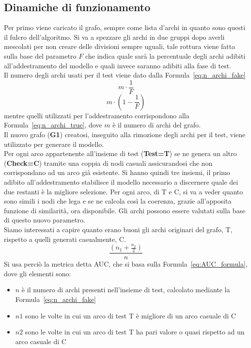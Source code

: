 \subsection{Dinamiche di funzionamento}
Per primo viene caricato il grafo, sempre come lista d'archi in quanto sono questi il fulcro dell'algoritmo. Si va a spezzare gli archi in due gruppi dopo averli mescolati per non creare delle divisioni sempre uguali, tale rottura viene fatta sulla base del parametro $F$ che indica quale sarà la percentuale degli archi adibiti all'addestramento del modello e quali invece saranno adibiti alla fase di test.\\
Il numero degli archi usati per il test viene dato dalla Formula~\ref{eq:n_archi_fake}
\begin{equation}
	m \cdot \frac{1}{F}
	\label{eq:n_archi_fake}
\end{equation} 
\begin{equation}
	m \cdot \left( 1- \frac{1}{F} \right)
	\label{eq:n_archi_true}
\end{equation}
mentre quelli utilizzati per l'addestramento corrispondono alla Formula~\ref{eq:n_archi_true}, dove $m$ è il numero di archi del grafo.\\
Il nuovo grafo (\textbf{G1}) creatosi, inseguito alla rimozione degli archi per il test, viene utilizzato per generare il modello.\\
Per ogni arco appartenente all'insieme di test (\textbf{Test=T}) se ne genera un altro (\textbf{Check=C}) tramite una coppia di nodi casuali assicurandosi che non corrispondano ad un arco già esistente. Si hanno quindi tre insiemi, il primo adibito all'addestramento stabilisce il modello necessario a discernere quale dei due restanti è la migliore selezione.
Per ogni arco, di T e C, si va a veder quanto sono simili i nodi che lega e se ne calcola così la coerenza, grazie all'apposita funzione di similarità, ora disponibile. Gli archi possono essere valutati sulla base di questo nuovo parametro.\\
Siamo interessati a capire quanto erano buoni gli archi originari del grafo, T, rispetto a quelli generati casualmente, C. 
\begin{equation}
	\frac{\left( n_1 + \frac{n_2}{2} \right)}{n}
	\label{eq:AUC_formula}
\end{equation}
Si usa perciò la metrica detta AUC\cite{AUC_metric}, che si basa sulla Formula~\ref{eq:AUC_formula}, dove gli elementi sono:
\begin{itemize}
	\item $n$ è il numero di archi presenti nell'insieme di test, calcolato mediante la Formula~\ref{eq:n_archi_fake}
	\item $n1$ sono le volte in cui un arco di test T è migliore di un arco casuale di C
	\item $n2$ sono le volte in cui un arco di test T ha pari valore o quasi rispetto ad un arco casuale di C
\end{itemize}
